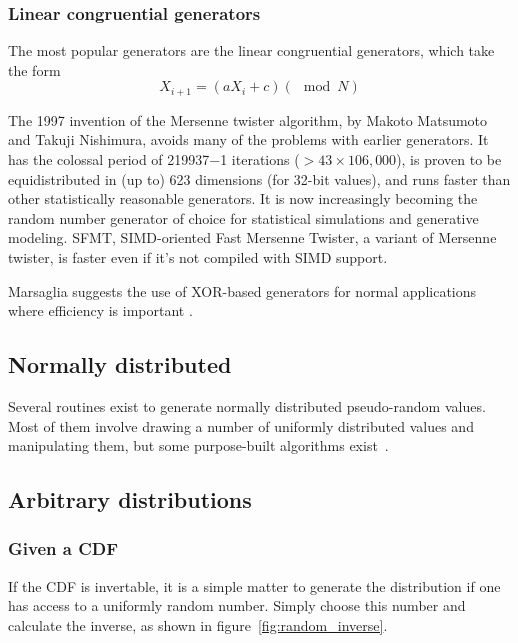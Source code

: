 \subsubsection{Linear congruential generators}
The most popular generators are the linear congruential generators, which take the form \citep[10]{knuth1997art}
\begin{equation}
X_{i+1} = (aX_i +c) (\mod N)
\end{equation}

The 1997 invention of the Mersenne twister algorithm, by Makoto Matsumoto and Takuji Nishimura, avoids many of the problems with earlier generators.
It has the colossal period of 219937−1 iterations ($>43\times106,000$), is proven to be equidistributed in (up to) 623 dimensions (for 32-bit values), and runs faster than other statistically reasonable generators.
It is now increasingly becoming the random number generator of choice for statistical simulations and generative modeling.
SFMT, SIMD-oriented Fast Mersenne Twister, a variant of Mersenne twister, is faster even if it's not compiled with SIMD support.

Marsaglia suggests the use of XOR-based generators for normal
applications where efficiency is important \citehere.

\subsection{Normally distributed}
Several routines exist to generate normally distributed pseudo-random values.
Most of them involve drawing a number of uniformly distributed values and manipulating them, but some purpose-built algorithms exist~\citehere.

\subsection{Arbitrary distributions}

\subsubsection{Given a CDF}
If the CDF is invertable, it is a simple matter to generate the distribution if one has access to a uniformly random number.
Simply choose this number and calculate the inverse, as shown in figure~\ref{fig:random_inverse}.

